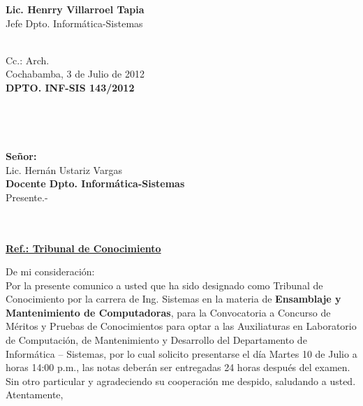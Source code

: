 \documentclass[letterpaper,11pt]{letter}
\begin{document}
\vspace{3.5cm}
\begin{center}
\begin{minipage}[b]{0.5\textwidth}
\begin{center}
{\bf Lic. Henrry Villarroel Tapia}\\
Jefe Dpto. Informática-Sistemas\\
\end{center}
\end{minipage}
\end{center}
~\\
Cc.: Arch.\\
\newpage
Cochabamba, 3 de Julio de 2012~\\
 \textbf{DPTO. INF-SIS 143/2012}\\
~\\
~\\
~\\
~\\
 \textbf{Señor:}~\\
Lic. Hernán Ustariz Vargas~\\
 \textbf{Docente Dpto. Informática-Sistemas}~\\
Presente.-\\
~\\
~\\
\begin{center}
\underline{ \textbf{Ref.: Tribunal de Conocimiento}}
\end{center}
De mi consideración:\\
Por la presente comunico a usted que ha sido designado como Tribunal de Conocimiento por la carrera de Ing. Sistemas en la materia de \textbf{Ensamblaje y Mantenimiento de Computadoras}, para la Convocatoria a Concurso de Méritos y Pruebas de Conocimientos para optar a las Auxiliaturas en Laboratorio de Computación, de Mantenimiento y Desarrollo del Departamento de Informática – Sistemas, por lo cual solicito presentarse el día Martes 10 de Julio a horas 14:00 p.m., las notas deberán ser entregadas 24 horas después del examen.\\
Sin otro particular y agradeciendo su cooperación me despido, saludando a usted.\\
Atentamente,\\
\end{document}
